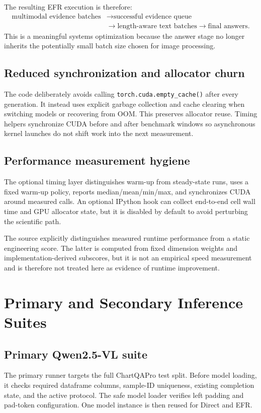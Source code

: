 \documentclass[11pt,a4paper]{article}
\newcommand{\code}[1]{\texttt{#1}}
\begin{document}
The resulting EFR execution is therefore:
\[
\begin{aligned}
\text{multimodal evidence batches} &\rightarrow \text{successful evidence queue} \\
&\rightarrow \text{length-aware text batches}
\rightarrow \text{final answers}.
\end{aligned}
\]
This is a meaningful systems optimization because the answer stage no longer inherits the potentially small batch size chosen for image processing.

\subsection{Reduced synchronization and allocator churn}
The code deliberately avoids calling \code{torch.cuda.empty\_cache()} after every generation. It instead uses explicit garbage collection and cache clearing when switching models or recovering from OOM. This preserves allocator reuse. Timing helpers synchronize CUDA before and after benchmark windows so asynchronous kernel launches do not shift work into the next measurement.

\subsection{Performance measurement hygiene}
The optional timing layer distinguishes warm-up from steady-state runs, uses a fixed warm-up policy, reports median/mean/min/max, and synchronizes CUDA around measured calls. An optional IPython hook can collect end-to-end cell wall time and GPU allocator state, but it is disabled by default to avoid perturbing the scientific path.

The source explicitly distinguishes measured runtime performance from a static engineering score. The latter is computed from fixed dimension weights and implementation-derived subscores, but it is not an empirical speed measurement and is therefore not treated here as evidence of runtime improvement.

\section{Primary and Secondary Inference Suites}
\subsection{Primary Qwen2.5-VL suite}
The primary runner targets the full ChartQAPro test split. Before model loading, it checks required dataframe columns, sample-ID uniqueness, existing completion state, and the active protocol. The safe model loader verifies left padding and pad-token configuration. One model instance is then reused for Direct and EFR.
\end{document}

